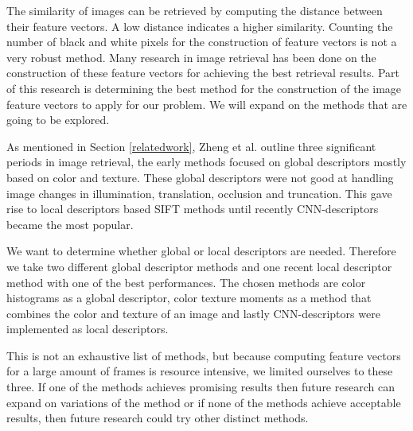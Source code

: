 \documentclass{article}
\begin{document}
The similarity of images can be retrieved by computing the distance between their feature vectors. A low distance indicates a higher similarity. Counting the number of black and white pixels for the construction of feature vectors is not a very robust method. Many research in image retrieval has been done on the construction of these feature vectors for achieving the best retrieval results. Part of this research is determining the best method for the construction of the image feature vectors to apply for our problem. We will expand on the methods that are going to be explored. 

As mentioned in Section \ref{relatedwork}, Zheng et al. \cite{zheng2018sift} outline three significant periods in image retrieval, the early methods focused on global descriptors mostly based on color and texture. These global descriptors were not good at handling image changes in illumination, translation, occlusion and truncation. This gave rise to local descriptors based SIFT methods until recently CNN-descriptors became the most popular. 

We want to determine whether global or local descriptors are needed. Therefore we take two different global descriptor methods and one recent local descriptor method with one of the best performances. The chosen methods are color histograms as a global descriptor, color texture moments \cite{yu2002colortexturemoments} as a method that combines the color and texture of an image and lastly CNN-descriptors were implemented as local descriptors.

This is not an exhaustive list of methods, but because computing feature vectors for a large amount of frames is resource intensive, we limited ourselves to these three. If one of the methods achieves promising results then future research can expand on variations of the method or if none of the methods achieve acceptable results, then future research could try other distinct methods.
\end{document}
